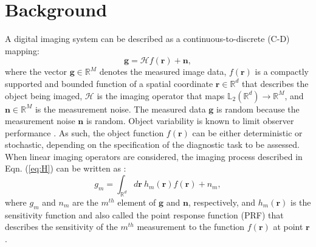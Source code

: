 \documentclass[journal]{IEEEtran}
\renewcommand{\vec}[1]{\mathbf{#1}}
\begin{document}
\vspace{1.1cm}
\section{Background}
\label{sec:background}
A digital imaging system can be  described as a continuous-to-discrete (C-D) mapping:
\begin{equation}\label{eq:H}
\vec{g} = \mathcal{H}f(\vec{r}) + \vec{n},
\end{equation}
where the vector $\vec{g}\in \mathbb{R}^M$ denotes the measured image data, 
$f(\vec{r})$ is a compactly supported and bounded function of a spatial coordinate $\vec{r}\in \mathbb{R}^d$ that describes
the object being imaged, $\mathcal{H}$ is the imaging operator that maps $\mathbb{L}_2(\mathbb{R}^d)\rightarrow \mathbb{R}^M$, and $\vec{n}\in \mathbb{R}^M$ is the measurement noise.
The measured data $\vec{g}$ is random because the measurement noise $\vec{n}$ is random.
Object variability is known to limit observer performance \cite{park2007efficiency}.
 As such, the object 
 function $f(\vec{r})$ can be either deterministic or stochastic, depending on
the specification of the diagnostic task to be assessed. When linear imaging operators are considered, 
the imaging process described in Eqn. (\ref{eq:H}) can be written as \cite{barrett2013foundations}:
\begin{equation}
g_m = \int_{\mathbb{R}^d} d\vec{r}\ h_m(\vec{r}) f(\vec{r}) + n_m,
\end{equation}
where $g_m$ and $n_m$ are the $m^{th}$ element of $\vec{g}$ and $\vec{n}$, respectively, 
and {$h_m(\vec{r})$ is the sensitivity function and also called the point response function (PRF) that describes the sensitivity of the $m^{th}$ measurement to the function $f(\vec{r})$ at point $\vec{r}$.}
\end{document}
